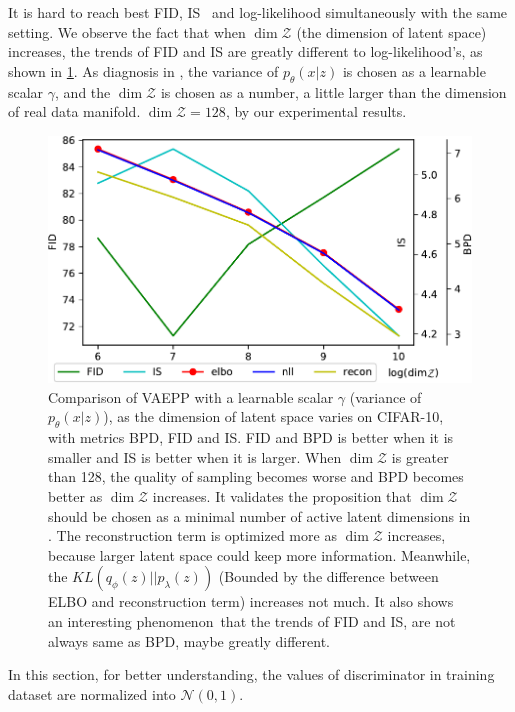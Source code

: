 It is hard to reach best FID, IS~\cite{salimans2016improved} and log-likelihood simultaneously with the same setting. We observe the fact that when $\dim \mathcal{Z}$ (the dimension of latent space) increases, the trends of FID and IS are greatly different to log-likelihood's, as shown in \cref{fig:fid_different_dim}. As diagnosis in \cite{dai2019diagnosing}, the variance of $p_\theta(x|z)$ is chosen as a learnable scalar $\gamma$, and the $\dim \mathcal{Z}$ is chosen as a number, a little larger than the dimension of real data manifold. $\dim \mathcal{Z} = 128$, by our experimental results.  

\begin{figure}[tb]
	\centering
	\includegraphics[width=1.0\columnwidth]{../dist.strip/z_dim}
	\caption{
	Comparison of VAEPP with a learnable scalar $\gamma$ (variance of $p_\theta(x|z)$), as the dimension of latent space varies on CIFAR-10, with metrics BPD, FID and IS. FID and BPD is better when it is smaller and IS is better when it is larger. When $\dim \mathcal{Z}$ is greater than 128, the quality of sampling becomes worse and BPD becomes better as $\dim \mathcal{Z}$ increases. It validates the proposition that $\dim \mathcal{Z}$ should be chosen as a minimal number of active latent dimensions in \protect\cite{dai2019diagnosing}. The reconstruction term is optimized more as $\dim \mathcal{Z}$ increases, because larger latent space could keep more information. Meanwhile, the $KL(q_\phi(z)||p_\lambda(z))$ (Bounded by the difference between ELBO and reconstruction term) increases not much. It also shows an interesting phenomenon that the  trends of FID and IS, are not always same as BPD, maybe greatly different. 
	}
	\label{fig:fid_different_dim}
\end{figure}

In this section, for better understanding, the values of discriminator in training dataset are normalized into $\mathcal{N}(0, 1)$.

